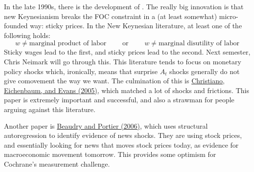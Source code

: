 \documentclass[10pt]{article}
\begin{document}
In the late 1990s, there is the development of . The really big innovation is that new Keynesianism breaks the FOC constraint in a (at least somewhat) micro-founded way: sticky prices. In the New Keynesian literature, at least one of the following holds:
\[
w \ne \text{marginal product of labor} \qquad \text{ or } \qquad w \ne \text{marginal disutility of labor}
\]
Sticky wages lead to the first, and sticky prices lead to the second. Next semester, Chris Neimark will go through this. This literature tends to focus on monetary policy shocks which, ironically, means that surprise $A_t$ shocks generally do not give comovement the way we want. The culmination of this is \href{https://faculty.wcas.northwestern.edu/yona/research/CEE2005.pdf}{Christiano, Eichenbaum, and Evans (2005)}, which matched a lot of shocks and frictions. This paper is extremely important and successful, and also a strawman for people arguing against this literature.

Another paper is \href{https://www.aeaweb.org/articles?id=10.1257/aer.96.4.1293}{Beaudry and Portier (2006)}, which uses structural autoregression to identify evidence of news shocks. They are using stock prices, and essentially looking for news that moves stock prices today, as evidence for macroeconomic movement tomorrow. This provides some optimism for Cochrane's measurement challenge.
\end{document}
